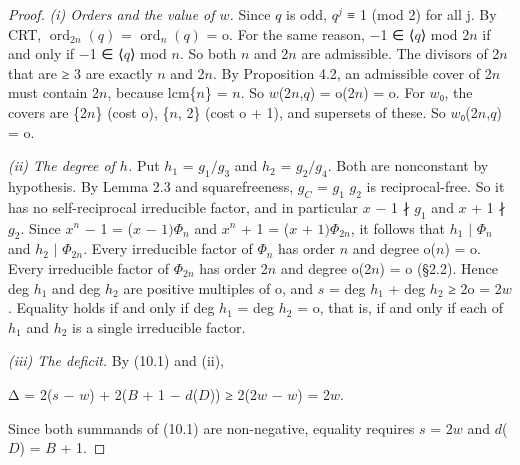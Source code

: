 \documentclass[pdflatex,sn-mathphys-num]{sn-jnl}
\theoremstyle{thmstyleone}
\theoremstyle{thmstylethree}
\begin{document}
\begin{proof}[Proof]

\emph{(i) Orders and the value of \(w\).} Since \(q\) is odd, \(q^j\) ≡ 1 (mod 2) for all j. By CRT, \(\operatorname{ord}_{2n}(q)\) = \(\operatorname{ord}_n(q)\) = o. For the same reason, −1 ∈ ⟨\(q\)⟩ mod 2\(n\) if and only if −1 ∈ ⟨\(q\)⟩ mod \(n\). So both \(n\) and 2\(n\) are admissible. The divisors of 2\(n\) that are ≥ 3 are exactly \(n\) and 2\(n\). By Proposition 4.2, an admissible cover of 2\(n\) must contain 2\(n\), because lcm\{\(n\)\} = \(n\). So \(w\)(2\(n\),\(q\)) = o(2\(n\)) = o. For \(w\)₀, the covers are \{2\(n\)\} (cost o), \{\(n\), 2\} (cost o + 1), and supersets of these. So \(w\)₀(2\(n\),\(q\)) = o.

\emph{(ii) The degree of \(h\).} Put \(h_1\) = \(g_1/g_3\) and \(h_2\) = \(g_2/g_4\). Both are nonconstant by hypothesis. By Lemma 2.3 and squarefreeness, \(g_C\) = \(g_1\) \(g_2\) is reciprocal-free. So it has no self-reciprocal irreducible factor, and in particular \(x\) − 1 ∤ \(g_1\) and \(x\) + 1 ∤ \(g_2\). Since \(x^n\) − 1 = (\(x\) − \(1)Φ_n\) and \(x^n\) + 1 = (\(x\) + \(1)Φ_{2n}\), it follows that \(h_1\) \(\mid\) \(Φ_n\) and \(h_2\) \(\mid\) \(Φ_{2n}\). Every irreducible factor of \(Φ_n\) has order \(n\) and degree o(\(n\)) = o. Every irreducible factor of \(Φ_{2n}\) has order 2\(n\) and degree o(2\(n\)) = o (§2.2). Hence deg \(h_1\) and deg \(h_2\) are positive multiples of o, and \(s\) = deg \(h_1\) + deg \(h_2\) ≥ 2o = 2\(w\). Equality holds if and only if deg \(h_1\) = deg \(h_2\) = o, that is, if and only if each of \(h_1\) and \(h_2\) is a single irreducible factor.

\emph{(iii) The deficit.} By (10.1) and (ii),

\begin{center}Δ = 2(\(s\) − \(w\)) + 2(\(B\) + 1 − \(d\)(\(D\))) ≥ 2(2\(w\) − \(w\)) = 2\(w\).\end{center}

Since both summands of (10.1) are non-negative, equality requires \(s\) = 2\(w\) and \(d\)(\(D\)) = \(B\) + 1.

\end{proof}
\end{document}
